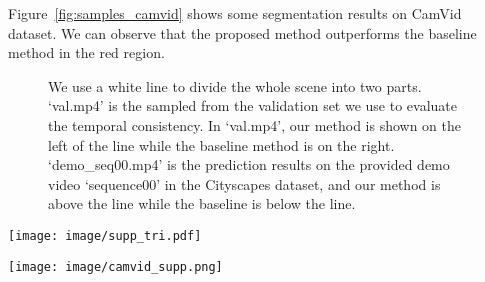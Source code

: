 \documentclass[runningheads]{llncs}
\begin{document}
Figure~\ref{fig:samples_camvid} shows some segmentation results on CamVid dataset.
We can observe that the proposed method outperforms the baseline method in the red region.
\begin{figure}[htp]
\setlength{\belowcaptionskip}{-0.2cm}
\centering
{}
\caption{We use a white line to divide the whole scene into two parts. `val.mp4' is the sampled from the validation set we use to evaluate the temporal consistency. In `val.mp4', our method is shown on the left of the line while the baseline method is on the right. `demo\_seq00.mp4' is the prediction results on the provided demo video `sequence00' in the Cityscapes dataset, and our method is above the line while the baseline is below the line.}

\label{fig:demo examples}
\end{figure}

\begin{figure*}[htp]
    \centering
    \texttt{[image: image/supp\_tri.pdf]}
    \caption{Consecutive frames in two videos. \textbf{First row}:`demo\_seq00.mp4'. Our results are on the top right. \textbf{Second row}:`val.mp4'. Our results are on the left.  More results can be found in the supplementary videos.}
    \label{fig:samples}
\end{figure*}{}


\begin{figure*}[htp]
    \centering
    \caption{Consecutive frames in 'Baseline\_SKD\_Accel\_Ours.mp4'. \textbf{Top left}: Baseline.\textbf{Top right}: SKD~\cite{liu2019structured}. \textbf{Bottom left}: Accel~\cite{jain2019accel}. \textbf{Bottom right}: Ours. There are jitters between keyframe and normal frame in the results sequence of Accel.
    More results can be found in the supplementary videos.}
    \label{fig:four}
\end{figure*}{}



\begin{figure*}
    \centering
    \texttt{[image: image/camvid\_supp.png]}
    \caption{Consecutive frames in Camvid dataset. \textbf{First row}: input frames. \textbf{Second row}: MobileNet trained with cross-entropy loss. \textbf{Third row}:MobileNet trained with the temporal loss and  distillation items. In the baseline method, the region in the red box keep changing while the proposed method can produce similar results on the still stuff.}
    \label{fig:samples_camvid}
\end{figure*}{}
\end{document}
